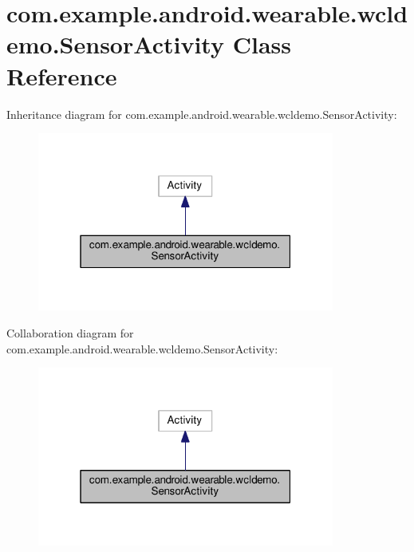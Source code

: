 \hypertarget{classcom_1_1example_1_1android_1_1wearable_1_1wcldemo_1_1SensorActivity}{}\section{com.\+example.\+android.\+wearable.\+wcldemo.\+Sensor\+Activity Class Reference}
\label{classcom_1_1example_1_1android_1_1wearable_1_1wcldemo_1_1SensorActivity}


Inheritance diagram for com.\+example.\+android.\+wearable.\+wcldemo.\+Sensor\+Activity\+:
\nopagebreak
\begin{figure}[H]
\begin{center}
\leavevmode
\includegraphics[width=277pt]{d9/d35/classcom_1_1example_1_1android_1_1wearable_1_1wcldemo_1_1SensorActivity__inherit__graph}
\end{center}
\end{figure}


Collaboration diagram for com.\+example.\+android.\+wearable.\+wcldemo.\+Sensor\+Activity\+:
\nopagebreak
\begin{figure}[H]
\begin{center}
\leavevmode
\includegraphics[width=277pt]{d2/d41/classcom_1_1example_1_1android_1_1wearable_1_1wcldemo_1_1SensorActivity__coll__graph}
\end{center}
\end{figure}
